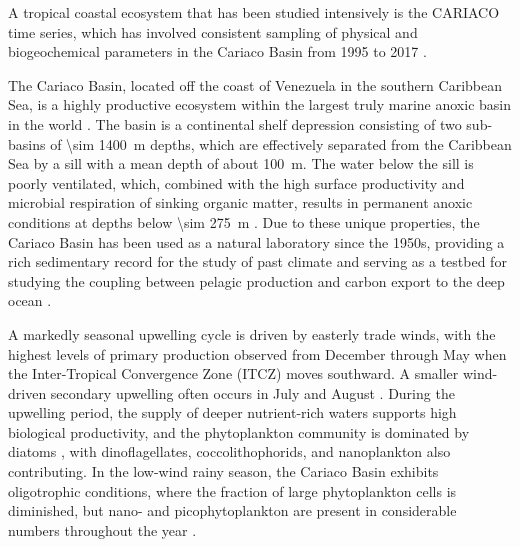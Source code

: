     
    A tropical coastal ecosystem that has been studied intensively is the CARIACO time series, which has involved consistent sampling of physical and biogeochemical parameters in the Cariaco Basin from 1995 to 2017 \cite{muller-karger_scientific_2019}. 
    
    The Cariaco Basin, located off the coast of Venezuela in the southern Caribbean Sea, is a highly productive ecosystem within the largest truly marine anoxic basin in the world \cite{edgcomb_accessing_2011}. The basin is a continental shelf depression consisting of two sub-basins of \qty{\sim 1400}{m} depths, which are effectively separated from the Caribbean Sea by a sill with a mean depth of about \qty{100}{m}. The water below the sill is poorly ventilated, which, combined with the high surface productivity and microbial respiration of sinking organic matter, results in permanent anoxic conditions at depths below \qty{\sim 275}{m} \cite{thunell_organic_2000}. Due to these unique properties, the Cariaco Basin has been used as a natural laboratory since the 1950s, providing a rich sedimentary record for the study of past climate \cite{hughen1996nature} and serving as a testbed for studying the coupling between pelagic production and carbon export to the deep ocean \cite{montes_vertical_2012}.

    A markedly seasonal upwelling cycle is driven by easterly trade winds, with the highest levels of primary production observed from December through May when the Inter-Tropical Convergence Zone (ITCZ) moves southward. A smaller wind-driven secondary upwelling often occurs in July and August \cite{mullerkarger_annual_2001, astor_seasonal_2003}. During the upwelling period, the supply of deeper nutrient-rich waters supports high biological productivity, and the phytoplankton community is dominated by diatoms \cite{romero_seasonal_2009}, with dinoflagellates, coccolithophorids, and nanoplankton also contributing. In the low-wind rainy season, the Cariaco Basin exhibits oligotrophic conditions, where the fraction of large phytoplankton cells is diminished, but nano- and picophytoplankton are present in considerable numbers throughout the year \cite{lorenzoni_characterization_2015}.    

